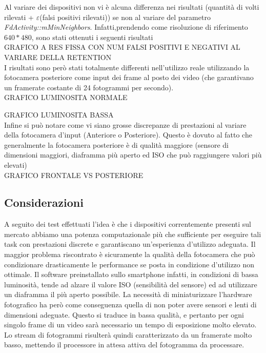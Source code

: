 Al variare dei dispositivi non vi è alcuna differenza nei risultati (quantità di volti rilevati + $\varepsilon$(falsi positivi rilevati)) se non al variare del parametro \textit{FdActivity::mMinNeighbors}. Infatti,prendendo come risoluzione di riferimento $640 \ast 480$, sono stati ottenuti i seguenti risultati
\\
GRAFICO A RES FISSA CON NUM FALSI POSITIVI E NEGATIVI AL VARIARE DELLA RETENTION 
\\
I risultati sono però stati totalmente differenti nell'utilizzo reale utilizzando la fotocamera posteriore come input dei frame al posto dei video (che garantivano un framerate costante di 24 fotogrammi per secondo). 
\\
GRAFICO LUMINOSITA NORMALE

GRAFICO LUMINOSITA BASSA
\\
Infine si può notare come vi siano grosse discrepanze di prestazioni al variare della fotocamera d'input (Anteriore o Posteriore). Questo è dovuto al fatto che generalmente la fotocamera posteriore è di qualità maggiore (sensore di dimensioni maggiori, diaframma più aperto ed ISO che può raggiungere valori più elevati)
\\
GRAFICO FRONTALE VS POSTERIORE

\subsection{Considerazioni}

A seguito dei test effettuati l'idea è che i dispositivi correntemente presenti sul mercato abbiamo una potenza computazionale più che sufficiente per eseguire tali task con prestazioni discrete e garantiscano un'esperienza d'utilizzo adeguata. Il maggior problema riscontrato è sicuramente la qualità della fotocamera che può condizionare drasticamente le performance se posta in condizione d'utilizzo non ottimale. Il software preinstallato sullo smartphone infatti, in condizioni di bassa luminosità, tende ad alzare il valore ISO (sensibilità del sensore) ed ad utilizzare un diaframma il più aperto possibile. La necessità di miniaturizzare l'hardware fotografico ha però come conseguenza quella di non poter avere sensori e lenti di dimensioni adeguate. Questo si traduce in bassa qualità, e pertanto per ogni singolo frame di un video sarà necessario un tempo di esposizione molto elevato. Lo stream di fotogrammi risulterà quindi caratterizzato da un framerate molto basso, mettendo il processore in attesa attiva del fotogramma da processare. 



